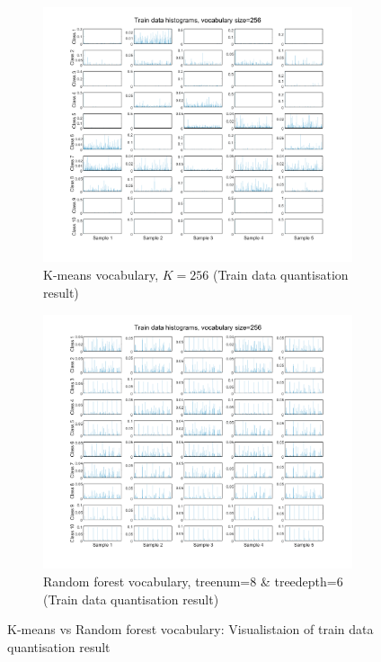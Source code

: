 \begin{figure}[htbp]
	\centering
	\begin{subfigure}[t]{0.5\linewidth}
		\centering
		\includegraphics[height=7.5cm]{image/q3-appendix/Kmtrain-256.png} 
		\caption{K-means vocabulary, $K=256$ (Train data quantisation result)}
	\end{subfigure}%
	\hfill
	\begin{subfigure}[t]{0.5\linewidth}
		\centering
		\includegraphics[height=7.5cm]{image/q3-appendix/RFtrain-256.png}
		\caption{Random forest vocabulary, treenum=8 \& treedepth=6 (Train data quantisation result)}
	\end{subfigure}

	\caption{K-means vs Random forest vocabulary: Visualistaion of train data quantisation result}
	\label{fig:q3_histogram_tr}
\end{figure}

